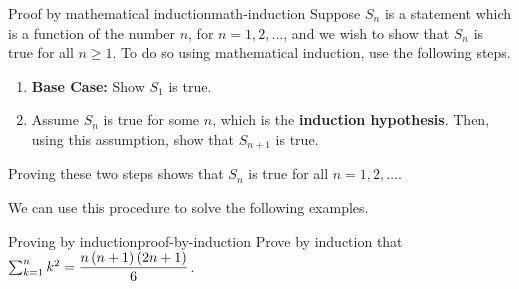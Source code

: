 \begin{procedure}{Proof by mathematical induction}{math-induction}
Suppose $S_{n}$ is a statement which is a function of the number $n$, for $n=1,2,\ldots$, and
we wish to show that $S_{n}$ is true for all $n \geq 1$. To do so using mathematical induction, use the 
following steps.
\begin{enumerate}
\item \textbf{Base Case:} Show $S_{1}$ is true.

\item Assume $S_{n}$ is true for some $n$, which is the \textbf{induction hypothesis}. Then, using this assumption, 
show that $S_{n+1}$ is true. 
\end{enumerate}

Proving these two steps shows that $S_{n}$ is true for all $n = 1,2,\ldots$.
\end{procedure}

We can use this procedure to solve the following examples.

\begin{example}{Proving by induction}{proof-by-induction}
Prove by induction that $\sum_{k=1}^{n}k^{2}=\displaystyle
\frac{n\left(n+1\right) \left(2n+1\right) }{6}$.
\end{example}

